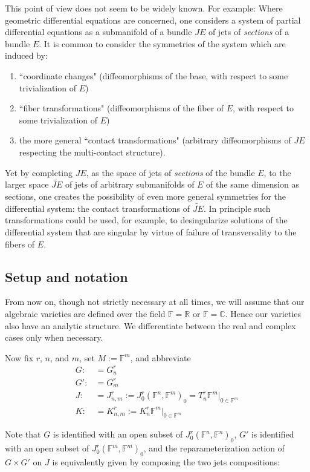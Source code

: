 \documentclass[12pt]{article}
\numberwithin{equation}{section}
\theoremstyle{plain}
\theoremstyle{definition}
\newcommand{\R}{\mathbb{R}}
\newcommand{\C}{\mathbb{C}}
\newcommand{\Fb}{\mathbb{F}}
\begin{document}
This point of view does not seem to be widely known. For example: Where geometric differential equations are concerned, one considers a system of partial differential equations as a submanifold of a bundle $JE$ of jets of \emph{sections} of a bundle $E$. It is common to consider the symmetries of the system which are induced by:
\begin{enumerate}
\itemsep0em
\item{``coordinate changes" (diffeomorphisms of the base, with respect to some trivialization of $E$)}
\item{``fiber transformations" (diffeomorphisms of the fiber of $E$, with respect to some trivialization of $E$)}
\item{the more general ``contact transformations" (arbitrary diffeomorphisms of $JE$ respecting the multi-contact structure).}
\end{enumerate}
Yet by completing $JE$, as the space of jets of \emph{sections} of the bundle $E$, to the larger space $\widetilde{JE}$ of jets of arbitrary submanifolds of $E$ of the same dimension as sections, one creates the possibility of even more general symmetries for the differential system: the contact transformations of $\widetilde{JE}$. In principle such transformations could be used, for example, to desingularize solutions of the differential system that are singular by virtue of failure of transversality to the fibers of $E$.

\subsection{Setup and notation}
From now on, though not strictly necessary at all times, we will assume that our algebraic varieties are defined over the field $\Fb=\R$ or $\Fb=\C$. Hence our varieties also have an analytic structure. We differentiate between the real and complex cases only when necessary.

Now fix $r$, $n$, and $m$, set $M:=\Fb^{m}$, and abbreviate
\begin{align*}
G:&=G^{r}_{n}\\
G':&=G^{r}_{m}\\
J:&=J^{r}_{n,m}:=J^{r}_{0}(\Fb^{n},\Fb^{m})_{0}=T^{r}_{n}\Fb^{m}|_{0\in \Fb^{m}}\\
K:&=K^{r}_{n,m}:=K^{r}_{n}\Fb^{m}|_{0\in\Fb^{m}}
\end{align*}

Note that $G$ is identified with an open subset of $J^{r}_{0}(\Fb^{n},\Fb^{n})_{0}$, $G'$ is identified with an open subset of $J^{r}_{0}(\Fb^{m},\Fb^{m})_{0}$, and the reparameterization action of $G\times G'$ on $J$ is equivalently given by composing the two jets compositions:
\end{document}
